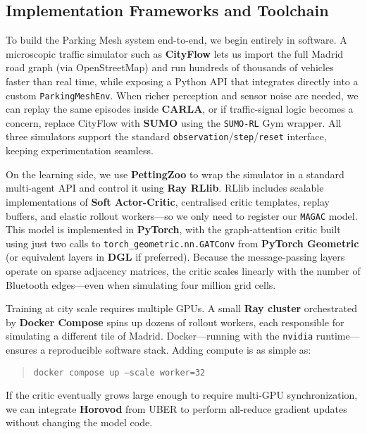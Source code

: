\subsection{Implementation Frameworks and Toolchain}

To build the Parking Mesh system end-to-end, we begin entirely in software. A microscopic traffic simulator such as \textbf{CityFlow} lets us import the full Madrid road graph (via OpenStreetMap) and run hundreds of thousands of vehicles faster than real time, while exposing a Python API that integrates directly into a custom \texttt{ParkingMeshEnv}. When richer perception and sensor noise are needed, we can replay the same episodes inside \textbf{CARLA}, or if traffic-signal logic becomes a concern, replace CityFlow with \textbf{SUMO} using the \texttt{SUMO-RL} Gym wrapper. All three simulators support the standard \texttt{observation}/\texttt{step}/\texttt{reset} interface, keeping experimentation seamless.

On the learning side, we use \textbf{PettingZoo} to wrap the simulator in a standard multi-agent API and control it using \textbf{Ray RLlib}. RLlib includes scalable implementations of \textbf{Soft Actor-Critic}, centralised critic templates, replay buffers, and elastic rollout workers—so we only need to register our \texttt{MAGAC} model. This model is implemented in \textbf{PyTorch}, with the graph-attention critic built using just two calls to \texttt{torch\_geometric.nn.GATConv} from \textbf{PyTorch Geometric} (or equivalent layers in \textbf{DGL} if preferred). Because the message-passing layers operate on sparse adjacency matrices, the critic scales linearly with the number of Bluetooth edges—even when simulating four million grid cells.

Training at city scale requires multiple GPUs. A small \textbf{Ray cluster} orchestrated by \textbf{Docker Compose} spins up dozens of rollout workers, each responsible for simulating a different tile of Madrid. Docker—running with the \texttt{nvidia} runtime—ensures a reproducible software stack. Adding compute is as simple as:

\begin{quote}
\texttt{docker compose up --scale worker=32}
\end{quote}

If the critic eventually grows large enough to require multi-GPU synchronization, we can integrate \textbf{Horovod} from UBER to perform all-reduce gradient updates without changing the model code.

